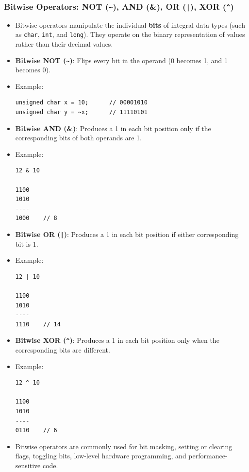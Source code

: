\documentclass[10pt]{article}
\begin{document}
\newpage

\subsubsection{Bitwise Operators: NOT (\texttt{\~}), AND (\&), OR (\texttt{|}), XOR (\texttt{\^})}

\begin{itemize}
	\item Bitwise operators manipulate the individual \textbf{bits} of integral data types (such as \verb|char|, \verb|int|, and \verb|long|). They operate on the binary representation of values rather than their decimal values.

	\item \textbf{Bitwise NOT (\texttt{\~})}: Flips every bit in the operand (0 becomes 1, and 1 becomes 0).

	\item Example:
	\begin{verbatim}
unsigned char x = 10;      // 00001010
unsigned char y = ~x;      // 11110101
	\end{verbatim}

	\item \textbf{Bitwise AND (\&)}: Produces a 1 in each bit position only if the corresponding bits of both operands are 1.

	\item Example:
	\begin{verbatim}
12 & 10

1100
1010
----
1000    // 8
	\end{verbatim}

	\item \textbf{Bitwise OR (\texttt{|})}: Produces a 1 in each bit position if either corresponding bit is 1.

	\item Example:
	\begin{verbatim}
12 | 10

1100
1010
----
1110    // 14
	\end{verbatim}

	\item \textbf{Bitwise XOR (\texttt{\string\^})}: Produces a 1 in each bit position only when the corresponding bits are different.

	\item Example:
	\begin{verbatim}
12 ^ 10

1100
1010
----
0110    // 6
	\end{verbatim}

	\item Bitwise operators are commonly used for bit masking, setting or clearing flags, toggling bits, low-level hardware programming, and performance-sensitive code.
\end{itemize}
\end{document}
